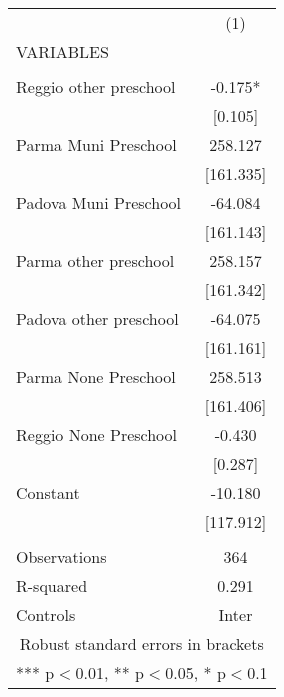 \begin{tabular}{lc} \hline
 & (1) \\
VARIABLES &  \\ \hline
 &  \\
Reggio other preschool & -0.175* \\
 & [0.105] \\
Parma Muni Preschool & 258.127 \\
 & [161.335] \\
Padova Muni Preschool & -64.084 \\
 & [161.143] \\
Parma other preschool & 258.157 \\
 & [161.342] \\
Padova other preschool & -64.075 \\
 & [161.161] \\
Parma None Preschool & 258.513 \\
 & [161.406] \\
Reggio None Preschool & -0.430 \\
 & [0.287] \\
Constant & -10.180 \\
 & [117.912] \\
 &  \\
Observations & 364 \\
R-squared & 0.291 \\
 Controls & Inter \\ \hline
\multicolumn{2}{c}{ Robust standard errors in brackets} \\
\multicolumn{2}{c}{ *** p$<$0.01, ** p$<$0.05, * p$<$0.1} \\
\end{tabular}
